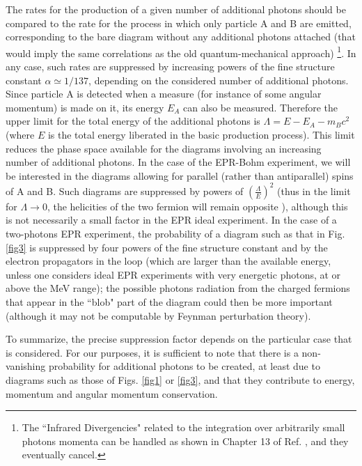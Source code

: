 \documentclass[aps,prl,showkeys,showpacs,preprint,groupedaddress]{revtex4}
\begin{document}
The rates for the production of a given number of additional
photons should be compared to the rate for the process in which
only particle A and B are emitted, corresponding to the bare
diagram without any additional photons attached (that would imply
the same correlations as the old quantum-mechanical approach)
\footnote{The ``Infrared Divergencies" related to the integration
over arbitrarily small photons momenta can be handled as shown in
Chapter 13 of Ref. \cite{WeinbookI}, and they eventually
cancel.}. In any case, such rates are suppressed by increasing
powers of the fine structure constant $\alpha\simeq 1/137$,
depending on the considered number of additional photons. Since
particle A is detected when a measure (for instance of some
angular momentum) is made on it, its energy $E_A$ can also be
measured. Therefore the upper limit for the total energy of the
additional photons is $\Lambda=E-E_A-m_Bc^2$ (where $E$ is the
total energy liberated in the basic production process). This
limit reduces the phase space available for the diagrams involving
an increasing number of additional photons. In the case of the
EPR-Bohm experiment, we will be interested in the diagrams
allowing for parallel (rather than antiparallel) spins of A and B.
Such diagrams are suppressed by powers of
$\left(\frac{\Lambda}{E}\right)^2$ (thus in the limit for
$\Lambda\to0$, the helicities of the two fermion will remain
opposite \cite{WeinbookI}), although this is not necessarily a
small factor in the EPR ideal experiment. In the case of a
two-photons EPR experiment, the probability of a diagram such as
that in Fig. \ref{fig3} is suppressed by four powers of the fine
structure constant and by the electron propagators in the loop
(which are larger than the available energy, unless one considers
ideal EPR experiments with very energetic photons, at or above the
MeV range); the possible photons radiation from the charged
fermions that appear in the ``blob" part of the diagram could then
be more important (although it may not be computable by Feynman
perturbation theory).

To summarize, the precise suppression factor depends on the
particular case that is considered. For our purposes, it is
sufficient to note that there is a non-vanishing probability for
additional photons to be created, at least due to diagrams such as
those of Figs. \ref{fig1} or \ref{fig3}, and that they contribute
to energy, momentum and angular momentum conservation.
\end{document}
